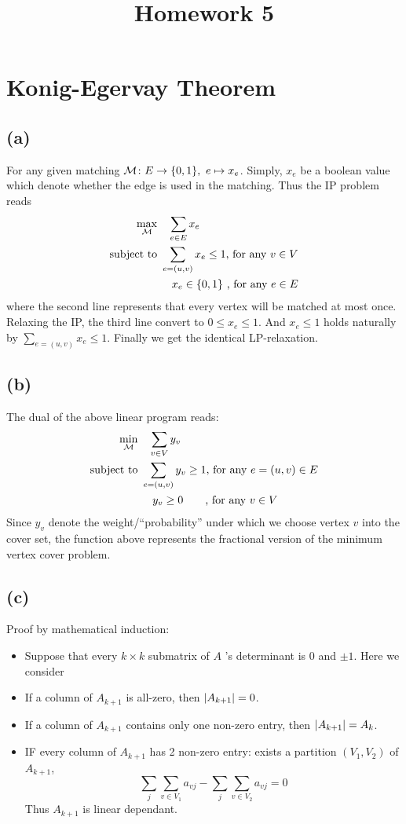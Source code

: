 \documentclass{article}
\begin{document}
\title{Homework 5}
\maketitle
\section{Konig-Egervay Theorem}
\subsection*{(a)}
For any given matching $ \mathcal{M}\colon E \to \{0,1\},\ e \mapsto x_e $. Simply, $x_e$ be a boolean value which denote whether the edge is used in the matching.
Thus the IP problem reads
\[
	\begin{aligned}
		\max_{\mathcal{M}}\  & \ \ \sum_{e\in E}x_e              \\
		\text{subject to }
		             &
		\sum_{e=(u,v)}x_e\le 1 \text{, for any $v\in V$} \\
		             & \ \ \
		x_e\in\{0,1\}\ \text{,\ for any $e\in E$}
	\end{aligned}
\]
where the second line represents that every vertex will be matched at most once. Relaxing the IP, the third line convert to $0\le x_e\le 1$. And $x_e\le 1$ holds naturally by $\sum_{e=(u,v)}x_e\le 1$. Finally we get the identical LP-relaxation.

\subsection*{(b)}
The dual of the above linear program reads:
\[
	\begin{aligned}
		\min_{\mathcal{M}}\  & \ \ \sum_{v\in V}y_v                    \\
		\text{subject to }
		             &
		\sum_{e=(u,v)}y_v\ge 1 \text{, for any $e=(u,v)\in E$} \\
		             & \ \ \
		y_v\ge 0 \ \ \ \ \ \ \text{, for any $v\in V$}
	\end{aligned}
\]
Since $y_v$ denote the weight/``probability'' under which we choose vertex $v$ into the cover set, the function above represents the fractional version of the minimum vertex cover problem.

\subsection*{(c)}
Proof by mathematical induction:
\begin{itemize}
	\item
	      Suppose that every $k\times k$ submatrix of $A$ 's determinant is $0$ and $\pm1$. Here we consider
	\item
	      If a column of $A_{k+1}$ is all-zero, then $\qty|A_{k+1}|=0$.
	\item
	      If a column of $A_{k+1}$ contains only one non-zero entry, then $\qty|A_{k+1}|=A_{k}$.
	\item
	      IF every column of $A_{k+1}$ has 2 non-zero entry: exists a partition $(V_1,V_2)$ of $A_{k+1}$,
	      \[
		      \sum_j\sum_{v\in V_1}a_{vj}-\sum_j\sum_{v\in V_2}a_{vj}=0
	      \]
	      Thus $A_{k+1}$ is linear dependant.
\end{itemize}
\end{document}
